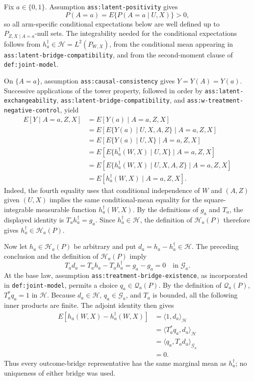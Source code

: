 Fix \(a\in\{0,1\}\).  Assumption \texttt{ass:latent-positivity} gives
\[
P(A=a)=E\{P(A=a\mid U,X)\}>0,
\]
so all arm-specific conditional expectations below are well defined up to
\(P_{Z,X\mid A=a}\)-null sets.  The integrability needed for the conditional
expectations follows from \(h_a^\dagger\in\mathcal H=L^2(P_{W,X})\), from the
conditional mean appearing in \texttt{ass:latent-bridge-compatibility}, and
from the second-moment clause of \texttt{def:joint-model}.

On \(\{A=a\}\), assumption \texttt{ass:causal-consistency} gives
\(Y=Y(A)=Y(a)\).  Successive applications of the tower property, followed in
order by \texttt{ass:latent-exchangeability},
\texttt{ass:latent-bridge-compatibility}, and
\texttt{ass:w-treatment-negative-control}, yield
\[
\begin{aligned}
E[Y\mid A=a,Z,X]
&=E[Y(a)\mid A=a,Z,X]\\
&=E\!\left[E\{Y(a)\mid U,X,A,Z\}\mid A=a,Z,X\right]\\
&=E\!\left[E\{Y(a)\mid U,X\}\mid A=a,Z,X\right]\\
&=E\!\left[E\{h_a^\dagger(W,X)\mid U,X\}\mid A=a,Z,X\right]\\
&=E\!\left[E\{h_a^\dagger(W,X)\mid U,X,A,Z\}\mid A=a,Z,X\right]\\
&=E[h_a^\dagger(W,X)\mid A=a,Z,X].
\end{aligned}
\]
Indeed, the fourth equality uses that conditional independence of \(W\) and
\((A,Z)\) given \((U,X)\) implies the same conditional-mean equality for the
square-integrable measurable function \(h_a^\dagger(W,X)\).  By the
definitions of \(g_a\) and \(T_a\), the displayed identity is
\(T_a h_a^\dagger=g_a\).  Since \(h_a^\dagger\in\mathcal H\), the definition
of \(\mathcal H_a(P)\) therefore gives
\(h_a^\dagger\in\mathcal H_a(P)\).

Now let \(h_a\in\mathcal H_a(P)\) be arbitrary and put
\(d_a=h_a-h_a^\dagger\in\mathcal H\).  The preceding conclusion and the
definition of \(\mathcal H_a(P)\) imply
\[
T_a d_a=T_a h_a-T_a h_a^\dagger=g_a-g_a=0
\quad\text{in }\mathcal G_a.
\]
At the base law, assumption \texttt{ass:treatment-bridge-existence}, as
incorporated in \texttt{def:joint-model}, permits a choice
\(q_a\in\mathcal Q_a(P)\).  By the definition of \(\mathcal Q_a(P)\),
\(T_a^*q_a=1\) in \(\mathcal H\).  Because \(d_a\in\mathcal H\),
\(q_a\in\mathcal G_a\), and \(T_a\) is bounded, all the following inner
products are finite.  The adjoint identity then gives
\[
\begin{aligned}
E[h_a(W,X)-h_a^\dagger(W,X)]
&=\langle 1,d_a\rangle_{\mathcal H}\\
&=\langle T_a^*q_a,d_a\rangle_{\mathcal H}\\
&=\langle q_a,T_a d_a\rangle_{\mathcal G_a}\\
&=0.
\end{aligned}
\]
Thus every outcome-bridge representative has the same marginal mean as
\(h_a^\dagger\); no uniqueness of either bridge was used.

